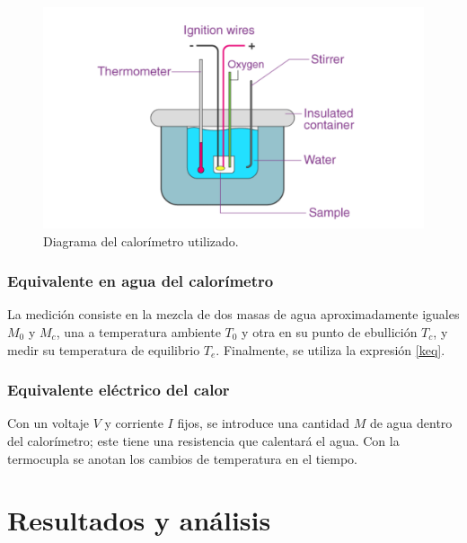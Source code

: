 \documentclass{article}
\begin{document}
\begin{figure}[H]
    \centering
    \includegraphics[scale=0.2]{calorimetro.png}
    \caption{Diagrama del calorímetro utilizado.}
    \label{fig:calorimetro}
\end{figure}

\subsubsection{Equivalente en agua del calorímetro}
La medición consiste en la mezcla de dos masas de agua aproximadamente iguales $M_0$ y $M_c$, una a temperatura ambiente $T_0$ y otra en su punto de ebullición $T_c$, y medir su temperatura de equilibrio $T_e$. Finalmente, se utiliza la expresión \ref{keq}.

\subsubsection{Equivalente eléctrico del calor}
Con un voltaje $V$ y corriente $I$ fijos, se introduce una cantidad $M$ de agua dentro del calorímetro; este tiene una resistencia que calentará el agua. Con la termocupla se anotan los cambios de temperatura en el tiempo.

\section{Resultados y análisis}
\end{document}
